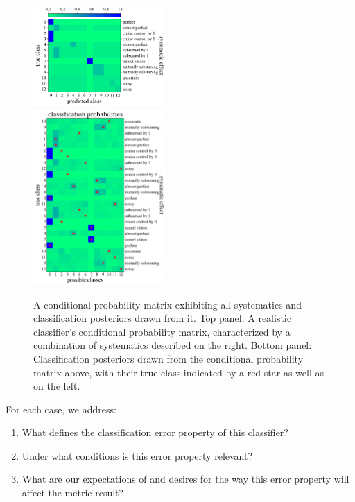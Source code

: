 \begin{figure}
	\begin{center}
		\includegraphics[width=0.45\textwidth]{./fig/combined.png}\\
    \includegraphics[width=0.45\textwidth]{./fig/examples.png}
		\caption{A conditional probability matrix exhibiting all systematics and classification posteriors drawn from it. Top panel: A realistic classifier's conditional probability matrix, characterized by a combination of systematics described on the right.  Bottom panel: Classification posteriors drawn from the conditional probability matrix above, with their true class indicated by a red star as well as on the left.
		}
		\label{fig:mock_probs}
	\end{center}
\end{figure}

For each case, we address:
\begin{enumerate}
  \item What defines the classification error property of this classifier?
  \item Under what conditions is this error property relevant?
  \item What are our expectations of and desires for the way this error property will affect the metric result?
\end{enumerate}

